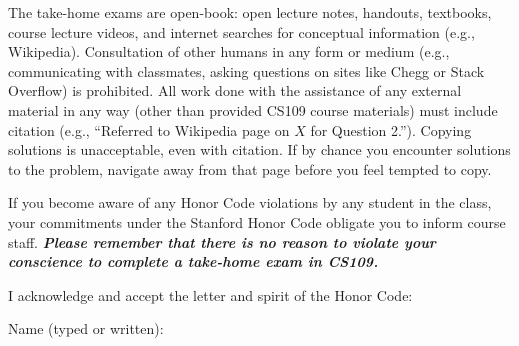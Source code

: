 The take-home exams are open-book: open lecture notes, handouts, textbooks, course lecture videos, and internet searches for conceptual information (e.g., Wikipedia). Consultation of other humans in any form or medium (e.g., communicating with classmates, asking questions on sites like Chegg or Stack Overflow) is prohibited. All work done with the assistance of any external material in any way (other than provided CS109 course materials) must include citation (e.g., ``Referred to Wikipedia page on $X$ for Question 2.''). Copying solutions is unacceptable, even with citation. If by chance you encounter solutions to the problem, navigate away from that page before you feel tempted to copy.

If you become aware of any Honor Code violations by any student in the class, your commitments under the Stanford Honor Code obligate you to inform course staff. \textit{\textbf{Please remember that there is no reason to violate your conscience to complete a take-home exam in CS109.}}

\vspace*{1em}

I acknowledge and accept the letter and spirit of the Honor Code:

\vspace*{1.5em}
Name (typed or written): \blank{} %

